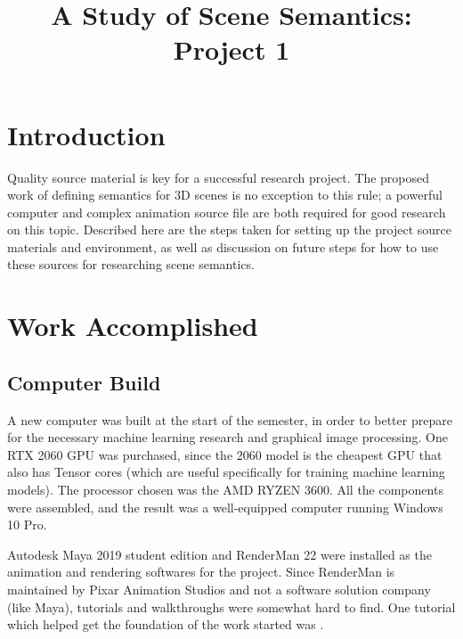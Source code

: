 \documentclass[conference]{IEEEtran}
\begin{document}
\title{A Study of Scene Semantics: Project 1}

\author{
}

\maketitle

\section{Introduction}
\label{sec:introduction}
Quality source material is key for a successful research project.
The proposed work of defining semantics for 3D scenes is no exception to this rule;
a powerful computer and complex animation source file are both required
for good research on this topic.
Described here are the steps taken for setting up the project
source materials and environment, as well as discussion on future steps
for how to use these sources for researching scene semantics.

\section{Work Accomplished}
\label{sec:work}

\subsection{Computer Build}
\label{subsec:build}
A new computer was built at the start of the semester, in order to better prepare for the necessary machine learning
research and graphical image processing. One RTX 2060 GPU was purchased,
since the 2060 model is the cheapest GPU that also has Tensor cores
(which are useful specifically for training machine learning models).
The processor chosen was the AMD RYZEN 3600.
All the components were assembled,
and the result was a well-equipped computer running Windows 10 Pro.

Autodesk Maya 2019 student edition
and RenderMan 22 were
installed as the animation and rendering softwares for the project.
Since RenderMan is maintained by Pixar Animation Studios and not a software solution company
(like Maya),
tutorials and walkthroughs were somewhat hard to find. One tutorial which helped get the foundation
of the work started was \cite{renderman}.
\end{document}
